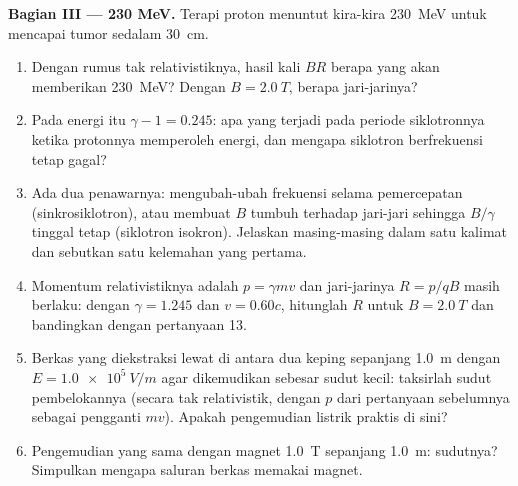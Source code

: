 \begin{problem}
\medskip
\noindent\textbf{Bagian III --- 230 MeV.}
Terapi proton menuntut kira-kira \qty{230}{MeV} untuk mencapai tumor
sedalam \qty{30}{cm}.
\begin{enumerate}[resume]
  \item Dengan rumus tak relativistiknya, hasil kali $BR$ berapa yang akan
        memberikan \qty{230}{MeV}? Dengan $B = \qty{2.0}{T}$, berapa jari-jarinya?
  \item Pada energi itu $\gamma - 1 = 0.245$: apa yang terjadi pada periode
        siklotronnya ketika protonnya memperoleh energi, dan mengapa
        siklotron berfrekuensi tetap gagal?
  \item Ada dua penawarnya: mengubah-ubah frekuensi  selama
        pemercepatan (sinkrosiklotron), atau membuat $B$ tumbuh terhadap jari-jari sehingga
        $B/\gamma$ tinggal tetap (siklotron isokron). Jelaskan
        masing-masing dalam satu kalimat dan sebutkan satu kelemahan yang pertama.
  \item Momentum relativistiknya adalah $p = \gamma mv$ dan jari-jarinya $R =
        p/qB$ masih berlaku: dengan $\gamma = 1.245$ dan $v = 0.60c$, hitunglah
        $R$ untuk $B = \qty{2.0}{T}$ dan bandingkan dengan pertanyaan 13.
  \item Berkas yang diekstraksi lewat di antara dua keping sepanjang \qty{1.0}{m}
        dengan $E = \qty{1.0e5}{V/m}$ agar dikemudikan sebesar sudut kecil:
        taksirlah sudut pembelokannya (secara tak relativistik, dengan $p$
        dari pertanyaan sebelumnya sebagai pengganti $mv$). Apakah pengemudian
        listrik praktis di sini?
  \item Pengemudian yang sama dengan magnet \qty{1.0}{T} sepanjang \qty{1.0}{m}:
        sudutnya? Simpulkan mengapa saluran berkas memakai magnet.
\end{enumerate}


\end{problem}
